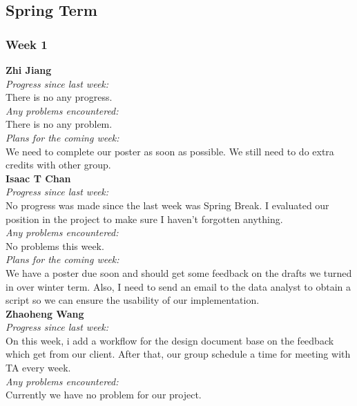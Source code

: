 \subsection{Spring Term}
\subsubsection{Week 1}

\textbf{Zhi Jiang}\\
\noindent\textit{Progress since last week:}\\
There is no any progress.\\

\noindent\textit{Any problems encountered:}\\
There is no any problem.\\

\noindent\textit{Plans for the coming week:}\\
We need to complete our poster as soon as possible. We still need to do extra credits with other group.\\

\noindent\textbf{Isaac T Chan}\\
\noindent\textit{Progress since last week:}\\
No progress was made since the last week was Spring Break. I evaluated our position in the project to make sure I haven't forgotten anything.\\

\noindent\textit{Any problems encountered:}\\
No problems this week.\\

\noindent\textit{Plans for the coming week:}\\
We have a poster due soon and should get some feedback on the drafts we turned in over winter term. Also, I need to send an email to the data analyst to obtain a script so we can ensure the usability of our implementation.\\

\noindent\textbf{Zhaoheng Wang}\\
\noindent\textit{Progress since last week:}\\
On this week, i add a workflow for the design document base on the feedback which get from our client. After that, our group schedule a time for meeting with TA every week.\\

\noindent\textit{Any problems encountered:}\\
Currently we have no problem for our project.\\

